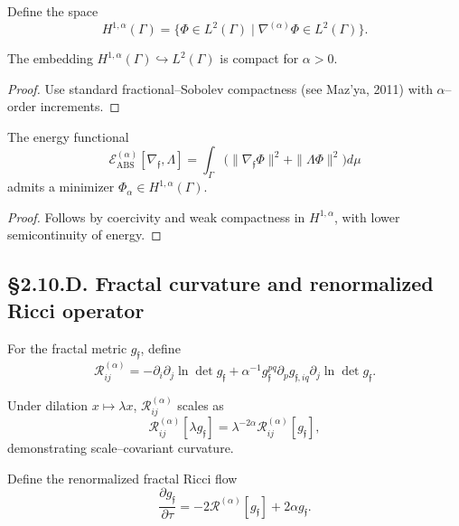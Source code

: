 \begin{definition}
Define the space
\[
H^{1,\alpha}(\Gamma)=
\{\Phi\in L^2(\Gamma)\mid \nabla^{(\alpha)}\Phi\in L^2(\Gamma)\}.
\]
\]
\end{definition}

\begin{lemma}
The embedding $H^{1,\alpha}(\Gamma)\hookrightarrow L^2(\Gamma)$ is compact for $\alpha>0$.
\end{lemma}

\begin{proof}
Use standard fractional–Sobolev compactness (see Maz’ya, 2011) with $\alpha$–order increments.
\end{proof}

\begin{theorem}\label{thm:2.10.min}
The energy functional
\[
\mathcal{E}_{\mathrm{ABS}}^{(\alpha)}[\nabla_\mathfrak{f},\Lambda]
=\int_\Gamma \big(\|\nabla_\mathfrak{f}\Phi\|^2 + \|\Lambda\Phi\|^2\big)d\mu
\]
admits a minimizer $\Phi_\alpha\in H^{1,\alpha}(\Gamma)$.
\end{theorem}

\begin{proof}
Follows by coercivity and weak compactness in $H^{1,\alpha}$, with lower semicontinuity of energy.
\end{proof}

\subsection*{§2.10.D. Fractal curvature and renormalized Ricci operator}

\begin{definition}
For the fractal metric $g_\mathfrak{f}$, define
\[
\mathcal{R}_{ij}^{(\alpha)}=
-\partial_i\partial_j \ln \det g_\mathfrak{f}
+\alpha^{-1}g_\mathfrak{f}^{pq}\partial_p g_{\mathfrak{f},iq}\partial_j \ln\det g_\mathfrak{f}.
\]
\]
\end{definition}

\begin{lemma}
Under dilation $x\mapsto\lambda x$, $\mathcal{R}_{ij}^{(\alpha)}$ scales as
\[
\mathcal{R}_{ij}^{(\alpha)}[\lambda g_\mathfrak{f}] = \lambda^{-2\alpha}\mathcal{R}_{ij}^{(\alpha)}[g_\mathfrak{f}],
\]
demonstrating scale–covariant curvature.
\end{lemma}

\begin{definition}
Define the renormalized fractal Ricci flow
\[
\frac{\partial g_\mathfrak{f}}{\partial \tau}
=-2\mathcal{R}^{(\alpha)}[g_\mathfrak{f}]+2\alpha g_\mathfrak{f}.
\]
\]
\end{definition}

